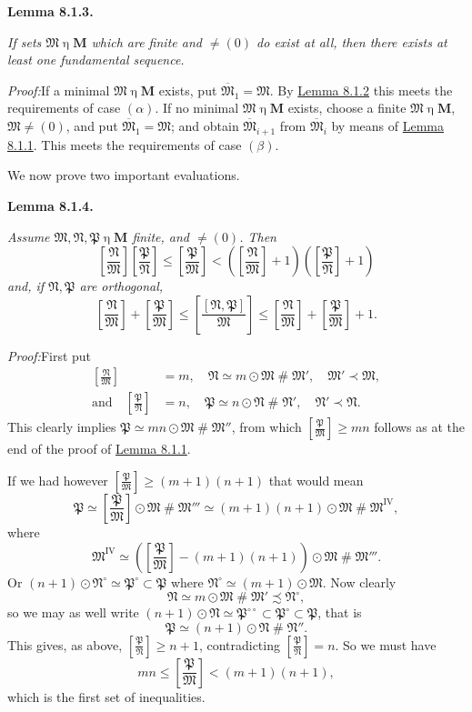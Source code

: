 \documentclass[12pt,b5paper,twoside]{article}
\newcommand{\M}{\mathbf M}
\newcommand{\reldiv}[2]{\left[\frac{#1}{#2}\right]}
\newcommand{\Lemma}[1]{%
  \par\smallskip\noindent\phantomsection\label{lem:#1}\textbf{Lemma #1.}\enspace
}
\newcommand{\Proof}{\par\noindent\textit{Proof:}\enspace}
\newcommand{\lemref}[1]{\hyperref[lem:#1]{Lemma #1}}
\begin{document}
\Lemma{8.1.3}
{\itshape
If sets $\mathfrak M\mathbin\eta\M$ which are finite and $\ne(0)$ do exist at
all, then there exists at least one fundamental sequence.}

\Proof If a minimal $\mathfrak M\mathbin\eta\M$ exists, put
$\overline{\mathfrak M}_1=\mathfrak M$. By \lemref{8.1.2} this meets the
requirements of case $(\alpha)$. If no minimal $\mathfrak M\mathbin\eta\M$ exists,
choose a finite $\mathfrak M\mathbin\eta\M$, $\mathfrak M\ne(0)$, and put
$\overline{\mathfrak M}_1=\mathfrak M$; and obtain
$\overline{\mathfrak M}_{i+1}$ from $\overline{\mathfrak M}_i$ by means of
\lemref{8.1.1}. This meets the requirements of case $(\beta)$.

We now prove two important evaluations.

\Lemma{8.1.4}
{\itshape
Assume $\mathfrak M,\mathfrak N,\mathfrak P\mathbin\eta\M$ finite, and
$\ne(0)$. Then
\[
 \reldiv{\mathfrak N}{\mathfrak M}
 \reldiv{\mathfrak P}{\mathfrak N}
 \leq \reldiv{\mathfrak P}{\mathfrak M}
 <\left(\reldiv{\mathfrak N}{\mathfrak M}+1\right)
  \left(\reldiv{\mathfrak P}{\mathfrak N}+1\right)
\]
and, if $\mathfrak N,\mathfrak P$ are orthogonal,
\[
 \reldiv{\mathfrak N}{\mathfrak M}
 +\reldiv{\mathfrak P}{\mathfrak M}
 \leq\reldiv{[\mathfrak N,\mathfrak P]}{\mathfrak M}
 \leq\reldiv{\mathfrak N}{\mathfrak M}
 +\reldiv{\mathfrak P}{\mathfrak M}+1.
\]}

\Proof First put
\[
 \begin{aligned}
 \reldiv{\mathfrak N}{\mathfrak M}&=m,
 \quad \mathfrak N\simeq m\odot\mathfrak M\mathbin{\#}\mathfrak M',
 \quad \mathfrak M'\prec\mathfrak M,\\
 \text{and}\quad \reldiv{\mathfrak P}{\mathfrak N}&=n,
 \quad \mathfrak P\simeq n\odot\mathfrak N\mathbin{\#}\mathfrak N',
 \quad \mathfrak N'\prec\mathfrak N.
 \end{aligned}
\]
This clearly implies
$\mathfrak P\simeq mn\odot\mathfrak M\mathbin{\#}\mathfrak M''$, from which
$\reldiv{\mathfrak P}{\mathfrak M}\geq mn$ follows as at the end of the proof
of \lemref{8.1.1}.

If we had however
$\reldiv{\mathfrak P}{\mathfrak M}\geq(m+1)(n+1)$ that would mean
\[
 \mathfrak P\simeq
 \reldiv{\mathfrak P}{\mathfrak M}\odot\mathfrak M
 \mathbin{\#}\mathfrak M'''
 \simeq(m+1)(n+1)\odot\mathfrak M\mathbin{\#}\mathfrak M^{\mathrm{IV}},
\]
where
\[
 \mathfrak M^{\mathrm{IV}}\simeq
 \left(\reldiv{\mathfrak P}{\mathfrak M}-(m+1)(n+1)\right)
 \odot\mathfrak M\mathbin{\#}\mathfrak M'''.
\]
Or $(n+1)\odot\mathfrak N^\circ\simeq\mathfrak P^\circ\subset\mathfrak P$
where $\mathfrak N^\circ\simeq(m+1)\odot\mathfrak M$. Now clearly
\[
 \mathfrak N\simeq m\odot\mathfrak M\mathbin{\#}\mathfrak M'
 \precsim\mathfrak N^\circ,
\]
so we may as well write
$(n+1)\odot\mathfrak N\simeq\mathfrak P^{\circ\circ}
\subset\mathfrak P^\circ\subset\mathfrak P$, that is
\[
 \mathfrak P\simeq(n+1)\odot\mathfrak N\mathbin{\#}\mathfrak N''.
\]
This gives, as above,
$\reldiv{\mathfrak P}{\mathfrak N}\geq n+1$, contradicting
$\reldiv{\mathfrak P}{\mathfrak N}=n$. So we must have
\[
 mn\leq\reldiv{\mathfrak P}{\mathfrak M}<(m+1)(n+1),
\]
which is the first set of inequalities.
\end{document}
